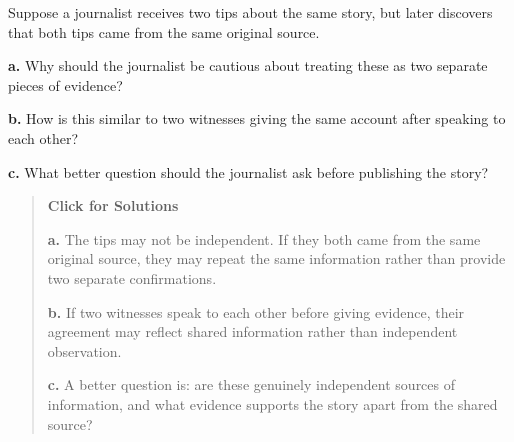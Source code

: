 \documentclass[
  letterpaper,
  DIV=11,
  numbers=noendperiod]{scrreprt}
\begin{document}
\begin{tcolorbox}[enhanced jigsaw, arc=.35mm, bottomrule=.15mm, bottomtitle=1mm, breakable, colback=white, colbacktitle=quarto-callout-note-color!10!white, colframe=quarto-callout-note-color-frame, coltitle=black, left=2mm, leftrule=.75mm, opacityback=0, opacitybacktitle=0.6, rightrule=.15mm, title=\textcolor{quarto-callout-note-color}{\faInfo}\hspace{0.5em}{Question 12}, titlerule=0mm, toprule=.15mm, toptitle=1mm]

Suppose a journalist receives two tips about the same story, but later
discovers that both tips came from the same original source.

\textbf{a.} Why should the journalist be cautious about treating these
as two separate pieces of evidence?

\textbf{b.} How is this similar to two witnesses giving the same account
after speaking to each other?

\textbf{c.} What better question should the journalist ask before
publishing the story?

\begin{quote}
\textbf{Click for Solutions}

\textbf{a.} The tips may not be independent. If they both came from the
same original source, they may repeat the same information rather than
provide two separate confirmations.

\textbf{b.} If two witnesses speak to each other before giving evidence,
their agreement may reflect shared information rather than independent
observation.

\textbf{c.} A better question is: are these genuinely independent
sources of information, and what evidence supports the story apart from
the shared source?
\end{quote}

\end{tcolorbox}
\end{document}
